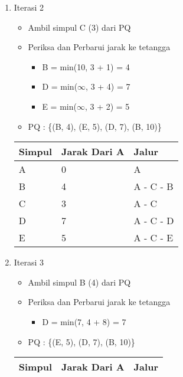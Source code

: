 \begin{enumerate}
    \item Iterasi 2
    \begin{itemize}
        \item Ambil simpul C (3) dari PQ
        \item Periksa dan Perbarui jarak ke tetangga
        \begin{itemize}
            \item B = min(10, 3 + 1) = 4
            \item D = min($\infty$, 3 + 4) = 7
            \item E = min($\infty$, 3 + 2) = 5
        \end{itemize}
        \item PQ : \{(B, 4), (E, 5), (D, 7), (B, 10)\}
    \end{itemize}
    \begin{table}[H]
        \begin{tabular}{|l|l|l|}
        \hline
            \textbf{Simpul} & \textbf{Jarak Dari A} & \textbf{Jalur} \\ \hline
            A               & 0                     & A     \\ \hline
            B               & 4                     & A - C - B     \\ \hline
            C               & 3                     & A - C     \\ \hline
            D               & 7                     & A - C - D     \\ \hline
            E               & 5                     & A - C - E     \\ \hline
        \end{tabular}
    \end{table}
\newpage
    \item Iterasi 3
    \begin{itemize}
        \item Ambil simpul B (4) dari PQ
        \item Periksa dan Perbarui jarak ke tetangga
        \begin{itemize}
            \item D = min(7, 4 + 8) = 7
        \end{itemize}
        \item PQ : \{(E, 5), (D, 7), (B, 10)\}
    \end{itemize}
    \begin{table}[h]
        \begin{tabular}{|l|l|l|}
        \hline
            \textbf{Simpul} & \textbf{Jarak Dari A} & \textbf{Jalur} \\ \hline

\end{tabular}
\end{table}
\end{enumerate}
